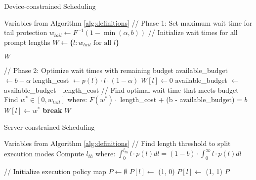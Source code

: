 \begin{algorithm}[ht]
\caption{Device-constrained Scheduling}
\label{alg:device_constrained}
\begin{algorithmic}[1]
\REQUIRE Variables from Algorithm \ref{alg:definitions}
\STATE // Phase 1: Set maximum wait time for tail protection
\STATE $w_{tail} \leftarrow F^{-1}(1 - \min(\alpha, b))$ 
\STATE // Initialize wait times for all prompt lengths
\STATE $W \leftarrow \{l: w_{tail} \text{ for all } l\}$

    \RETURN $W$ 
\ENDIF

\STATE // Phase 2: Optimize wait times with remaining budget
\STATE available\_budget $\leftarrow b - \alpha$
    \STATE length\_cost $\leftarrow p(l) \cdot l \cdot (1-\alpha)$ 
        \STATE $W[l] \leftarrow 0$ 
        \STATE available\_budget $\leftarrow$ available\_budget - length\_cost
    \ELSE
        \STATE // Find optimal wait time that meets budget
        \STATE Find $w^* \in [0, w_{tail}]$ where:
        \STATE $F(w^*) \cdot$ length\_cost + (b - available\_budget) = $b$
        \STATE $W[l] \leftarrow w^*$
        \STATE \textbf{break}
    \ENDIF
\ENDFOR
\RETURN $W$ 
\end{algorithmic}
\end{algorithm}

\begin{algorithm}[ht]
\caption{Server-constrained Scheduling}
\label{alg:server_constrained}
\begin{algorithmic}[1]
\REQUIRE Variables from Algorithm \ref{alg:definitions}
\STATE // Find length threshold to split execution modes
\STATE Compute $l_{th}$ where: $\int_0^{l_{th}} l \cdot p(l) dl = (1-b) \cdot \int_0^\infty l \cdot p(l) dl$

\STATE // Initialize execution policy map
\STATE $P \leftarrow \emptyset$ 
        \STATE $P[l] \leftarrow$ (1, 0) 
    \ELSE
        \STATE $P[l] \leftarrow$ (1, 1) 
    \ENDIF
\ENDFOR
\RETURN $P$ 
\end{algorithmic}
\end{algorithm}